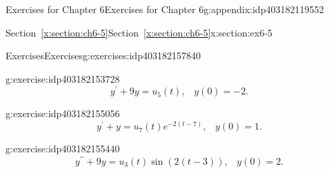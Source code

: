 \documentclass[oneside,10pt,]{book}
\newcommand{\xreffont}{\relax}
\numberwithin{equation}{section}
\numberwithin{equation}{section}
\begin{document}
\begin{appendixptx}{Exercises for Chapter 6}{}{Exercises for Chapter 6}{}{}{g:appendix:idp403182119552}
\begin{sectionptx}{Section~{\xreffont\ref*{x:section:ch6-5}}}{}{Section~{\xreffont\ref*{x:section:ch6-5}}}{}{}{x:section:ex6-5}
%
%
\typeout{************************************************}
\typeout{************************************************}
%
\begin{exercises-subsection-numberless}{Exercises}{}{Exercises}{}{}{g:exercises:idp403182157840}
\begin{divisionexercise}{1}{}{}{g:exercise:idp403182153728}%
%
\begin{equation*}
y^{\prime}+9y=u_{5}(t),\,\,\,\,\,y(0)=-2.
\end{equation*}
\end{divisionexercise}%
\begin{divisionexercise}{2}{}{}{g:exercise:idp403182155056}%
%
\begin{equation*}
y^{\prime}+y=u_{7}(t)e^{-2\left(t-7\right)},\,\,\,\,\,y(0)=1.
\end{equation*}
\end{divisionexercise}%
\begin{divisionexercise}{3}{}{}{g:exercise:idp403182155440}%
%
\begin{equation*}
y^{\prime\prime}+9y=u_{3}(t)\sin\left(2\left(t-3\right)\right),\,\,\,\,\,y(0)=2.
\end{equation*}
\end{divisionexercise}%
\end{exercises-subsection-numberless}
\end{sectionptx}
\end{appendixptx}
%
\backmatter
%
\end{document}
